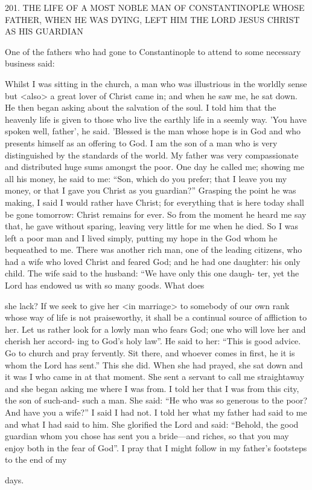 201.
THE LIFE OF A MOST NOBLE MAN
OF CONSTANTINOPLE WHOSE FATHER,
WHEN HE WAS DYING, LEFT HIM
THE LORD JESUS CHRIST AS HIS GUARDIAN

One of the fathers who had gone to Constantinople to attend to
some necessary business said:

Whilst I was sitting in the church, a man who was illustrious in the
worldly sense but <also> a great lover of Christ came in; and when
he saw me, he sat down.
He then began asking about the salvation
of the soul.
I told him that the heavenly life is given to those who
live the earthly life in a seemly way.
'You have spoken well, father',
he said.
'Blessed is the man whose hope is in God and who presents
himself as an offering to God.
I am the son of a man who is very
distinguished by the standards of the world.
My father was very
compassionate and distributed huge sums amongst the poor.
One
day he called me; showing me all his money, he said to me: “Son,
which do you prefer; that I leave you my money, or that I gave you
Christ as you guardian?” Grasping the point he was making, I said
I would rather have Christ; for everything that is here today shall
be gone tomorrow: Christ remains for ever.
So from the moment he
heard me say that, he gave without sparing, leaving very little for
me when he died.
So I was left a poor man and I lived simply,
putting my hope in the God whom he bequeathed to me.
There was
another rich man, one of the leading citizens, who had a wife who
loved Christ and feared God; and he had one daughter: his only
child.
The wife said to the husband: “We have only this one daugh-
ter, yet the Lord has endowed us with so many goods.
What does

she lack? If we seek to give her <in marriage> to somebody of our
own rank whose way of life is not praiseworthy, it shall be a
continual source of affliction to her.
Let us rather look for a lowly
man who fears God; one who will love her and cherish her accord-
ing to God's holy law”.
He said to her: “This is good advice.
Go to
church and pray fervently.
Sit there, and whoever comes in first, he
it is whom the Lord has sent.” This she did.
When she had prayed,
she sat down and it was I who came in at that moment.
She sent a
servant to call me straightaway and she began asking me where I
was from.
I told her that I was from this city, the son of such-and-
such a man.
She said: “He who was so generous to the poor? And
have you a wife?” I said I had not.
I told her what my father had
said to me and what I had said to him.
She glorified the Lord and
said: “Behold, the good guardian whom you chose has sent you a
bride—and riches, so that you may enjoy both in the fear of God”.
I pray that I might follow in my father's footsteps to the end of my

days.

